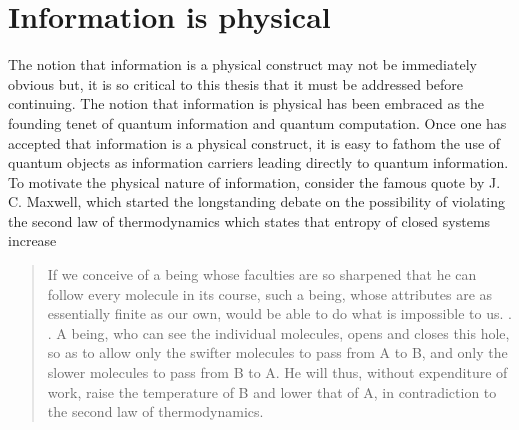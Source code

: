 \documentclass[11pt,oneside,final]{huthesis}%
\begin{document}
\section{Information is physical}
\label{sec:info}
The notion that information is a physical construct may not be immediately obvious but, it is so critical to this thesis that it must be addressed before continuing. The notion that information is physical has been embraced as the founding tenet of quantum information and quantum computation.  Once one has accepted that information is a physical construct, it is easy to fathom the use of quantum objects as information carriers leading directly to quantum information.  To motivate the physical nature of information, consider the famous quote by J. C. Maxwell, which started the longstanding debate on the possibility of violating the second law of thermodynamics which states that entropy of closed systems increase~\cite{Maxwell01}
\begin{quote}
	If we conceive of a being whose faculties are so
sharpened that he can follow every molecule in its course,
such a being, whose attributes are as essentially finite as
our own, would be able to do what is impossible to us. . . A
being, who can see the individual molecules, opens and
closes this hole, so as to allow only the swifter molecules
to pass from A to B, and only the slower molecules to
pass from B to A. He will thus, without expenditure of
work, raise the temperature of B and lower that of A, in
contradiction to the second law of thermodynamics.
\end{quote}
\end{document}
